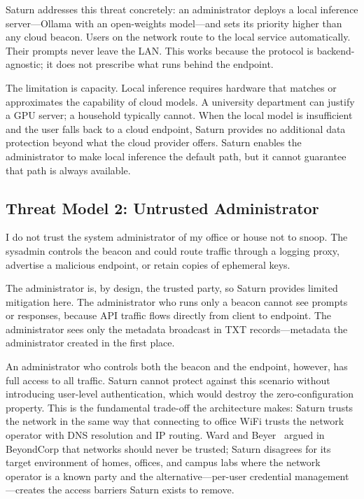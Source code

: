 Saturn addresses this threat concretely: an administrator deploys a local inference server---Ollama with an open-weights model---and sets its priority higher than any cloud beacon. Users on the network route to the local service automatically. Their prompts never leave the LAN. This works because the protocol is backend-agnostic; it does not prescribe what runs behind the endpoint.

The limitation is capacity. Local inference requires hardware that matches or approximates the capability of cloud models. A university department can justify a GPU server; a household typically cannot. When the local model is insufficient and the user falls back to a cloud endpoint, Saturn provides no additional data protection beyond what the cloud provider offers. Saturn enables the administrator to make local inference the default path, but it cannot guarantee that path is always available.

\subsection{Threat Model 2: Untrusted Administrator}
\label{sec:threat-admin}

I do not trust the system administrator of my office or house not to snoop. The sysadmin controls the beacon and could route traffic through a logging proxy, advertise a malicious endpoint, or retain copies of ephemeral keys.

The administrator is, by design, the trusted party, so Saturn provides limited mitigation here. The administrator who runs only a beacon cannot see prompts or responses, because API traffic flows directly from client to endpoint. The administrator sees only the metadata broadcast in TXT records---metadata the administrator created in the first place.

An administrator who controls both the beacon and the endpoint, however, has full access to all traffic. Saturn cannot protect against this scenario without introducing user-level authentication, which would destroy the zero-configuration property. This is the fundamental trade-off the architecture makes: Saturn trusts the network in the same way that connecting to office WiFi trusts the network operator with DNS resolution and IP routing. Ward and Beyer~\cite{ward2014beyondcorp} argued in BeyondCorp that networks should never be trusted; Saturn disagrees for its target environment of homes, offices, and campus labs where the network operator is a known party and the alternative---per-user credential management---creates the access barriers Saturn exists to remove.

